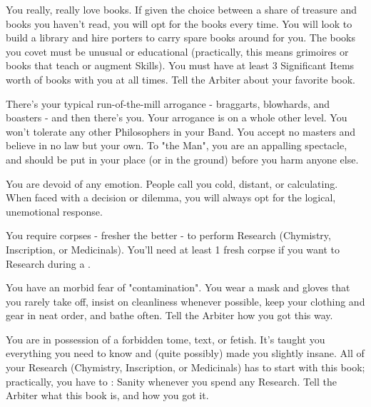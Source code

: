 {            

  You really, really love books. If given the choice between a share of treasure and books you haven't read, you will opt for the books every time.  You will look to build a library and hire porters to carry spare books around for you.  The books you covet must be unusual or educational (practically, this means grimoires or books that teach or augment Skills).  You must have at least 3 Significant Items worth of books with you at all times.  Tell the Arbiter about your favorite book.


  There's your typical run-of-the-mill arrogance - braggarts, blowhards, and boasters - and then there's you.  Your arrogance is on a whole other level.  You won't tolerate any other Philosophers in your Band.  You accept no masters and believe in no law but your own. To "the Man", you are an appalling spectacle, and should be put in your place (or in the ground) before you harm anyone else.


  You are devoid of any emotion.  People call you cold, distant, or calculating.  When faced with a decision or dilemma, you will always opt for the logical, unemotional response.


  You require corpses - fresher the better - to perform Research (Chymistry, Inscription, or Medicinals).  You'll need at least 1 fresh corpse if you want to Research during a . 

  \cbreak\bump


  You have an morbid fear of "contamination".  You wear a mask and gloves that you rarely take off, insist on cleanliness whenever possible, keep your clothing and gear in neat order, and bathe often. Tell the Arbiter how you got this way.


  You are in possession of a forbidden tome, text, or fetish.  It's taught you everything you need to know and (quite possibly) made you slightly insane.  All of your Research (Chymistry, Inscription, or Medicinals) has to start with this book; practically, you have to \RS: Sanity whenever you spend any Research.  Tell the Arbiter what this book is, and how you got it.

}
